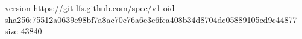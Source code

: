 version https://git-lfs.github.com/spec/v1
oid sha256:75512a0639e98bf7a8ac70c76a6e3c6fca408b34d8704dc05889105cd9c44877
size 43840
